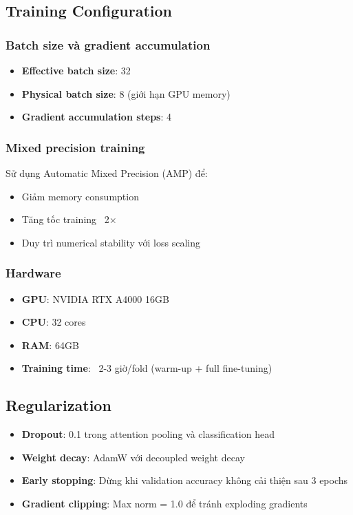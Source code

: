 \subsection{Training Configuration}

\subsubsection{Batch size và gradient accumulation}

\begin{itemize}
    \item \textbf{Effective batch size}: 32
    \item \textbf{Physical batch size}: 8 (giới hạn GPU memory)
    \item \textbf{Gradient accumulation steps}: 4
\end{itemize}

\subsubsection{Mixed precision training}

Sử dụng Automatic Mixed Precision (AMP) để:
\begin{itemize}
    \item Giảm memory consumption
    \item Tăng tốc training ~2×
    \item Duy trì numerical stability với loss scaling
\end{itemize}

\subsubsection{Hardware}

\begin{itemize}
    \item \textbf{GPU}: NVIDIA RTX A4000 16GB
    \item \textbf{CPU}: 32 cores
    \item \textbf{RAM}: 64GB
    \item \textbf{Training time}: ~2-3 giờ/fold (warm-up + full fine-tuning)
\end{itemize}

\subsection{Regularization}

\begin{itemize}
    \item \textbf{Dropout}: 0.1 trong attention pooling và classification head
    \item \textbf{Weight decay}: AdamW với decoupled weight decay
    \item \textbf{Early stopping}: Dừng khi validation accuracy không cải thiện sau 3 epochs
    \item \textbf{Gradient clipping}: Max norm = 1.0 để tránh exploding gradients
\end{itemize}

